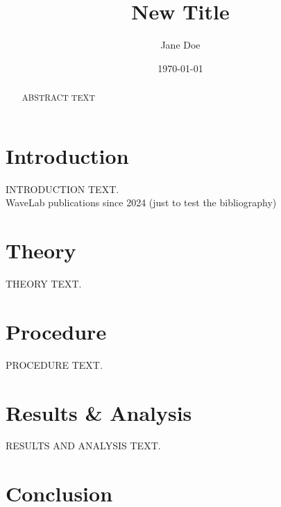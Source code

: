 \documentclass[aps,twocolumn]{revtex4}
\begin{document}
\title{New Title}
\author{Jane Doe}

\date{\today}

\begin{abstract}

ABSTRACT TEXT

\end{abstract}

\maketitle %

\section{Introduction}
\label{sec:Introduction}

INTRODUCTION TEXT.\\

WaveLab publications since 2024 (just to test the bibliography) \cite{Fuller2024, Cohen-Cobos2024,Manz2024,Manz2025a,Manz2025b,Wanner2026,Ren2026,Manz2026_book-chapter-a,Manz2026_book-chapter-b}

\section{Theory}
\label{sec:Theory}

THEORY TEXT.

\section{Procedure}
\label{sec:Procedure}

PROCEDURE TEXT.

\section{Results \& Analysis}
\label{sec:Results & Analysis}

RESULTS AND ANALYSIS TEXT.

\section{Conclusion}
\label{sec:Conclusion}
\end{document}
